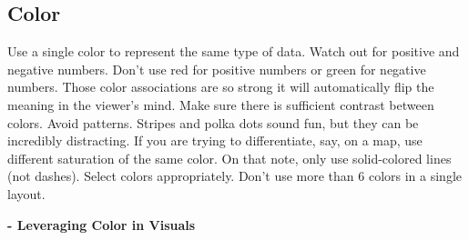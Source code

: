 \documentclass[]{book}
\begin{document}
\hypertarget{color}{%
\subsection{Color}\label{color}}

Use a single color to represent the same type of data. Watch out for positive and negative numbers. Don't use red for positive numbers or green for negative numbers. Those color associations are so strong it will automatically flip the meaning in the viewer's mind. Make sure there is sufficient contrast between colors. Avoid patterns. Stripes and polka dots sound fun, but they can be incredibly distracting. If you are trying to differentiate, say, on a map, use different saturation of the same color. On that note, only use solid-colored lines (not dashes). Select colors appropriately. Don't use more than 6 colors in a single layout.

\textbf{- Leveraging Color in Visuals}
\end{document}
